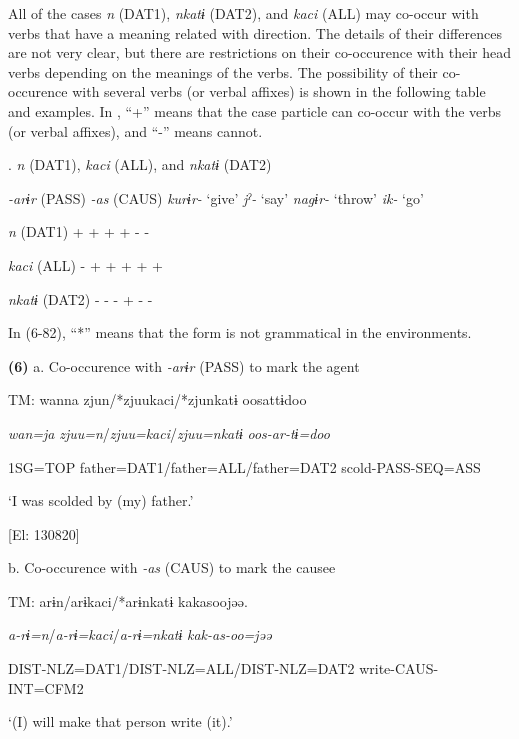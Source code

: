 All of the cases \textit{n} (DAT1), \textit{nkatɨ} (DAT2), and \textit{kaci} (ALL) may co-occur with verbs that have a meaning related with direction. The details of their differences are not very clear, but there are restrictions on their co-occurence with their head verbs depending on the meanings of the verbs. The possibility of their co-occurence with several verbs (or verbal affixes) is shown in the following table and examples. In , “+” means that the case particle can co-occur with the verbs (or verbal affixes), and “-” means cannot.

\begin{styleBeschriftung}
\textmd{}\textmd{.} \textmd{\textit{n}}\textmd{ (DAT1),} \textmd{\textit{kaci}}\textmd{ (ALL), and} \textmd{\textit{nkatɨ}}\textmd{ (DAT2)}
\end{styleBeschriftung}

    \textit{{}-arɨr} (PASS)  \textit{{}-as} (CAUS)  \textit{kurɨr-} ‘give’  \textit{jˀ-} ‘say’  \textit{nagɨr-} ‘throw’  \textit{ik-} ‘go’

\textit{n}  (DAT1)  +  +  +  +  {}-  {}-

\textit{kaci}  (ALL)  {}-  +  +  +  +  +

\textit{nkatɨ}  (DAT2)  {}-  {}-  {}-  +  {}-  {}-

In (6-82), “*” means that the form is not grammatical in the environments.

\textbf{(6)}  a. Co-occurence with \textit{{}-arɨr} (PASS) to mark the agent

  TM:  wanna  zjun/*zjuukaci/*zjunkatɨ  oosattɨdoo

    \textit{wan=ja}  \textit{zjuu=n}/\textit{zjuu=kaci}/\textit{zjuu=nkatɨ}  \textit{oos-ar-tɨ=doo}

    1SG=TOP  father=DAT1/father=ALL/father=DAT2  scold-PASS-SEQ=ASS

    ‘I was scolded by (my) father.’

    [El: 130820]

  b. Co-occurence with \textit{{}-as} (CAUS) to mark the causee

  TM:  arɨn/arɨkaci/*arɨnkatɨ  kakasoojəə.

    \textit{a-rɨ=n}/\textit{a-rɨ=kaci}/\textit{a-rɨ=nkatɨ}  \textit{kak-as-oo=jəə}

    DIST-NLZ=DAT1/DIST-NLZ=ALL/DIST-NLZ=DAT2  write-CAUS-INT=CFM2

    ‘(I) will make that person write (it).’

